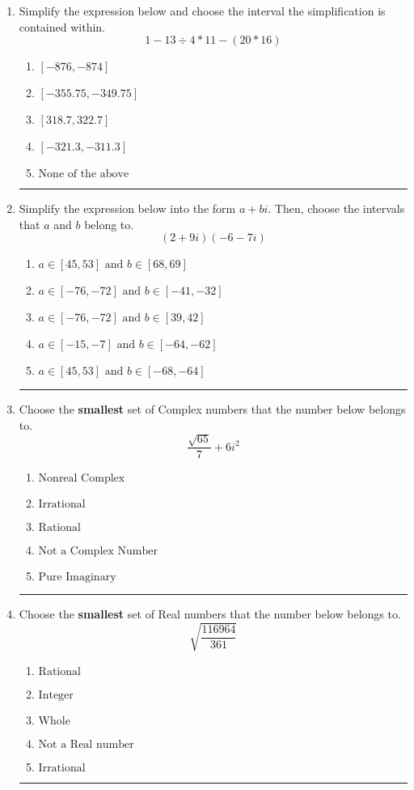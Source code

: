 \documentclass[14pt]{extbook}
\newcommand{\litem}[1]{\item#1\hspace*{-1cm}\rule{\textwidth}{0.4pt}}
\begin{document}
\begin{enumerate}
{\begin{enumerate}[label=\Alph*.]
\end{enumerate} }
\litem{
Simplify the expression below and choose the interval the simplification is contained within.\[ 1 - 13 \div 4 * 11 - (20 * 16) \]\begin{enumerate}[label=\Alph*.]
\item \( [-876, -874] \)
\item \( [-355.75, -349.75] \)
\item \( [318.7, 322.7] \)
\item \( [-321.3, -311.3] \)
\item \( \text{None of the above} \)

\end{enumerate} }
\litem{
Simplify the expression below into the form $a+bi$. Then, choose the intervals that $a$ and $b$ belong to.\[ (2 + 9 i)(-6 - 7 i) \]\begin{enumerate}[label=\Alph*.]
\item \( a \in [45, 53] \text{ and } b \in [68, 69] \)
\item \( a \in [-76, -72] \text{ and } b \in [-41, -32] \)
\item \( a \in [-76, -72] \text{ and } b \in [39, 42] \)
\item \( a \in [-15, -7] \text{ and } b \in [-64, -62] \)
\item \( a \in [45, 53] \text{ and } b \in [-68, -64] \)

\end{enumerate} }
\litem{
Choose the \textbf{smallest} set of Complex numbers that the number below belongs to.\[ \frac{\sqrt{65}}{7}+6i^2 \]\begin{enumerate}[label=\Alph*.]
\item \( \text{Nonreal Complex} \)
\item \( \text{Irrational} \)
\item \( \text{Rational} \)
\item \( \text{Not a Complex Number} \)
\item \( \text{Pure Imaginary} \)

\end{enumerate} }
\litem{
Choose the \textbf{smallest} set of Real numbers that the number below belongs to.\[ \sqrt{\frac{116964}{361}} \]\begin{enumerate}[label=\Alph*.]
\item \( \text{Rational} \)
\item \( \text{Integer} \)
\item \( \text{Whole} \)
\item \( \text{Not a Real number} \)
\item \( \text{Irrational} \)


\end{enumerate}}
\end{enumerate}
\end{document}
